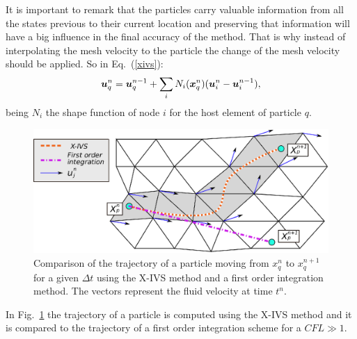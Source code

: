 It is important to remark that the particles carry valuable information from all the states previous to their current location and preserving that information will have a big influence in the final accuracy of the method. That is why instead of interpolating the mesh velocity to the particle the change of the mesh velocity should be applied. So in Eq.~(\ref{xivs}):
%
\begin{equation}\label{eq:partcor}
  \boldsymbol{u}_q^{n}=\boldsymbol{u}_q^{n-1}+\sum_{i}N_i(\boldsymbol{x}_q^n)(\boldsymbol{u}_i^n-\boldsymbol{u}_i^{n-1}),
\end{equation}
%
being $N_i$ the shape function of node $i$ for the host element of particle $q$.
\begin{figure}[htp] 
\centering 
\includegraphics[scale=.6]{./imgs/xivs.eps}
\caption{Comparison of the trajectory of a particle moving from $x_q^n$ to $x_q^{n+1}$ for a given $\Delta t$ using the X-IVS method and a first order integration method. The vectors represent the fluid velocity at time $t^n$.}
\label{fig:xivs}
\end{figure}
%
In Fig.~\ref{fig:xivs} the trajectory of a particle is computed using the X-IVS method and it is compared to the trajectory of a first order integration scheme for a $CFL \gg 1$. 

